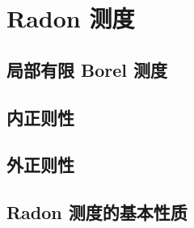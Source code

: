 \section{Radon 测度}
\label{b1:sec:1102}


\subsection{局部有限 Borel 测度}
\label{b1:subsec:110201}

\subsection{内正则性}
\label{b1:subsec:110202}

\subsection{外正则性}
\label{b1:subsec:110203}

\subsection{Radon 测度的基本性质}
\label{b1:subsec:110204}


